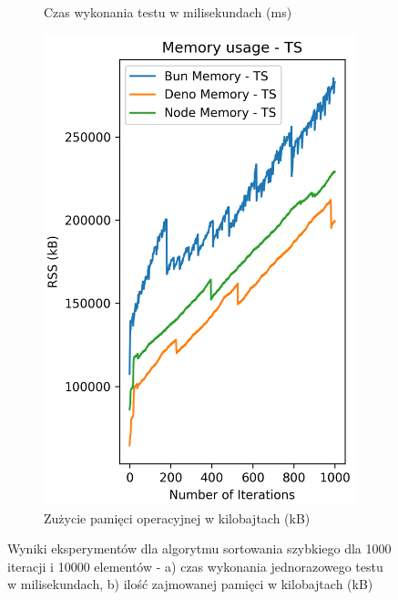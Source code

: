 \begin{figure}[H]
\begin{subfigure}[b]{0.42\textwidth}
    \caption{Czas wykonania testu w milisekundach (ms)}
    \label{fig:quick_sorting_e4_ts_time}
  \end{subfigure}
  \begin{subfigure}[b]{0.42\textwidth}
    \centering
    \includegraphics[width=\textwidth]{Figures/sorting/sorting_quick_1000_10000_ts_memory.png}
    \caption{Zużycie pamięci operacyjnej w kilobajtach (kB)}
    \label{fig:quick_sorting_e4_ts_memory}
  \end{subfigure}
  \caption{Wyniki eksperymentów dla algorytmu sortowania szybkiego dla 1000 iteracji i 10000 elementów - a) czas wykonania jednorazowego testu w milisekundach, b) ilość zajmowanej pamięci w kilobajtach (kB)}
  \label{fig:quick_sorting_e4_ts}
\end{figure}

